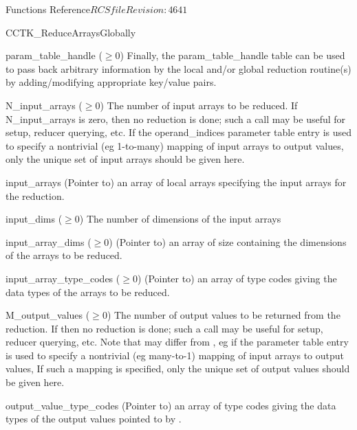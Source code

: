 \begin{cactuspart}{ Functions Reference}{$RCSfile$}{$Revision: 4641 $}
\begin{FunctionDescription}{CCTK\_ReduceArraysGlobally}
\begin{ParameterSection}
\begin{Parameter}{param\_table\_handle ($\ge 0$)}
Finally, the  param\_table\_handle  table can be used to pass back arbitrary
information by the local and/or global reduction routine(s) by
adding/modifying appropriate key/value pairs.
\end{Parameter}
\begin{Parameter}{N\_input\_arrays ($\ge 0$)}
The number of input arrays to be reduced.  If  N\_input\_arrays is zero,
then no reduction is done; such a call may be useful for setup,
reducer querying, etc.  If the  operand\_indices  parameter table
entry is used to specify a nontrivial (eg 1-to-many) mapping of input
arrays to output values, only the unique set of input arrays should
be given here.
\end{Parameter}
\begin{Parameter}{input\_arrays}
(Pointer to) an array of    local arrays specifying the input arrays
for the reduction.
\end{Parameter}
\begin{Parameter}{input\_dims ($\ge 0$)}
The number of dimensions of the input arrays
\end{Parameter}
\begin{Parameter}{input\_array\_dims ($\ge 0$)}
(Pointer to) an array  of size  containing the dimensions of the arrays to be reduced.
\end{Parameter}
\begin{Parameter}{input\_array\_type\_codes ($\ge 0$)}
(Pointer to) an array  of    type
codes giving the data types of the arrays to be reduced.
\end{Parameter}
\begin{Parameter}{M\_output\_values ($\ge 0$)}
The number of output values to be returned from the reduction.
If   then no reduction is done; such a call
may be useful for setup, reducer querying, etc.  Note that
  may differ from   , eg if the
  parameter table entry is used to specify a
nontrivial (eg many-to-1) mapping of input arrays to output values,
If such a mapping is specified, only the unique set of output values
should be given here.
\end{Parameter}
\begin{Parameter}{output\_value\_type\_codes}
(Pointer to) an array of     type
codes giving the data types of the output values pointed to by
.
\end{Parameter}

\end{ParameterSection}
\end{FunctionDescription}
\end{cactuspart}
